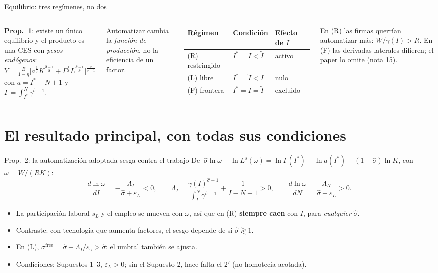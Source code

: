 \documentclass[aspectratio=169,10pt]{beamer}
\newcommand{\sh}{\hat\sigma}
\newcommand{\It}{\tilde I}
\newcommand{\Is}{I^{*}}
\newcommand{\eps}{\varepsilon}
\begin{document}
\begin{frame}{Equilibrio: tres regímenes, no dos}
\begin{columns}[T]
\textbf{Prop.~1}: existe un único equilibrio y el producto es una CES con \emph{pesos endógenos}:
\[
Y=\tfrac{B}{1-\eta}\Big[a^{\frac1\sh}K^{\frac{\sh-1}{\sh}}+\Gamma^{\frac1\sh}L^{\frac{\sh-1}{\sh}}\Big]^{\frac{\sh}{\sh-1}}
\]
con $a=\Is-N+1$ y $\Gamma=\int_{\Is}^N\gamma^{\sh-1}$.

\medskip
Automatizar cambia la \emph{función de producción}, no la eficiencia de un factor.
\small
\begin{tabular}{@{}lll@{}}
\toprule
Régimen & Condición & Efecto de $I$\\
\midrule
(R) restringido & $\Is=I<\It$ & activo\\
(L) libre & $\Is=\It<I$ & nulo\\
(F) frontera & $\Is=I=\It$ & excluido\\
\bottomrule
\end{tabular}

\medskip
En (R) las firmas querrían automatizar más: $W/\gamma(I)>R$. En (F) las derivadas laterales difieren; el paper lo omite (nota 15).
\end{columns}
\end{frame}

\section{El resultado principal, con todas sus condiciones}

\begin{frame}{Prop.~2: la automatización adoptada sesga contra el trabajo}
De $\ \sh\ln\omega+\ln L^s(\omega)=\ln\Gamma(\Is)-\ln a(\Is)+(1-\sh)\ln K$, con $\omega=W/(RK)$:
\[
\frac{d\ln\omega}{dI}=-\frac{\Lambda_I}{\sh+\eps_L}<0,\qquad
\Lambda_I=\frac{\gamma(I)^{\sh-1}}{\int_I^N\gamma^{\sh-1}}+\frac{1}{I-N+1}>0,
\qquad \frac{d\ln\omega}{dN}=\frac{\Lambda_N}{\sh+\eps_L}>0.
\]
\begin{itemize}
  \item La participación laboral $s_L$ y el empleo se mueven con $\omega$, así que en (R) \textbf{siempre caen} con $I$, para \emph{cualquier} $\sh$.
  \item Contraste: con tecnología que aumenta factores, el sesgo depende de si $\sh\gtrless1$.
  \item En (L), $\sigma^{\text{free}}=\sh+\Lambda_I/\eps_\gamma>\sh$: el umbral también se ajusta.
  \item Condiciones: Supuestos 1–3, $\eps_L>0$; sin el Supuesto 2, hace falta el 2$'$ (no homotecia acotada).
\end{itemize}
\end{frame}
\end{document}
